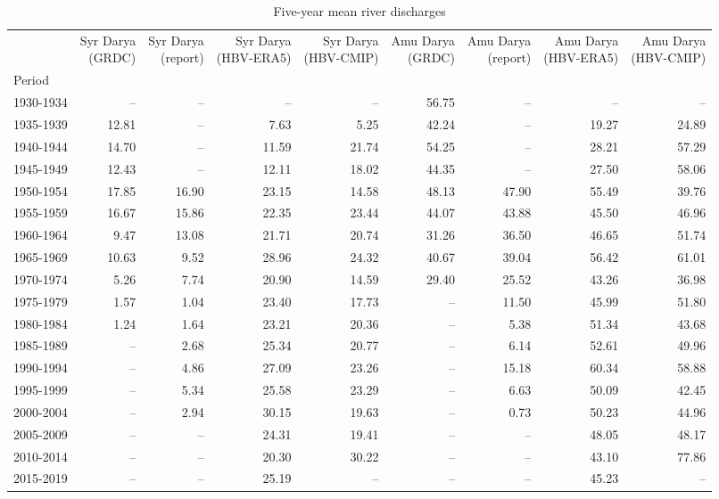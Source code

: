 \begin{footnotesize}
\begin{table}
\caption{Five-year mean river discharges}
\label{tab:five_year_discharge}
\begin{tabular}{lrrrrrrrr}
\toprule
 & \makecell{Syr Darya\\(GRDC)} & \makecell{Syr Darya\\(report)} & \makecell{Syr Darya\\(HBV-ERA5)} & \makecell{Syr Darya\\(HBV-CMIP)} & \makecell{Amu Darya\\(GRDC)} & \makecell{Amu Darya\\(report)} & \makecell{Amu Darya\\(HBV-ERA5)} & \makecell{Amu Darya\\(HBV-CMIP)} \\
Period &  &  &  &  &  &  &  &  \\
\midrule
1930-1934 & -- & -- & -- & -- & 56.75 & -- & -- & -- \\
1935-1939 & 12.81 & -- & 7.63 & 5.25 & 42.24 & -- & 19.27 & 24.89 \\
1940-1944 & 14.70 & -- & 11.59 & 21.74 & 54.25 & -- & 28.21 & 57.29 \\
1945-1949 & 12.43 & -- & 12.11 & 18.02 & 44.35 & -- & 27.50 & 58.06 \\
1950-1954 & 17.85 & 16.90 & 23.15 & 14.58 & 48.13 & 47.90 & 55.49 & 39.76 \\
1955-1959 & 16.67 & 15.86 & 22.35 & 23.44 & 44.07 & 43.88 & 45.50 & 46.96 \\
1960-1964 & 9.47 & 13.08 & 21.71 & 20.74 & 31.26 & 36.50 & 46.65 & 51.74 \\
1965-1969 & 10.63 & 9.52 & 28.96 & 24.32 & 40.67 & 39.04 & 56.42 & 61.01 \\
1970-1974 & 5.26 & 7.74 & 20.90 & 14.59 & 29.40 & 25.52 & 43.26 & 36.98 \\
1975-1979 & 1.57 & 1.04 & 23.40 & 17.73 & -- & 11.50 & 45.99 & 51.80 \\
1980-1984 & 1.24 & 1.64 & 23.21 & 20.36 & -- & 5.38 & 51.34 & 43.68 \\
1985-1989 & -- & 2.68 & 25.34 & 20.77 & -- & 6.14 & 52.61 & 49.96 \\
1990-1994 & -- & 4.86 & 27.09 & 23.26 & -- & 15.18 & 60.34 & 58.88 \\
1995-1999 & -- & 5.34 & 25.58 & 23.29 & -- & 6.63 & 50.09 & 42.45 \\
2000-2004 & -- & 2.94 & 30.15 & 19.63 & -- & 0.73 & 50.23 & 44.96 \\
2005-2009 & -- & -- & 24.31 & 19.41 & -- & -- & 48.05 & 48.17 \\
2010-2014 & -- & -- & 20.30 & 30.22 & -- & -- & 43.10 & 77.86 \\
2015-2019 & -- & -- & 25.19 & -- & -- & -- & 45.23 & -- \\
\bottomrule
\end{tabular}
\end{table}

\end{footnotesize}